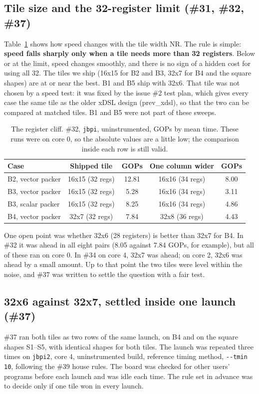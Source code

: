 \documentclass[11pt,a4paper]{article}
\newcommand{\slow}[1]{\textcolor{red!70!black}{#1}}
\begin{document}
\subsection{Tile size and the 32-register limit (\#31, \#32, \#37)}
\label{sec:tiles}
Table~\ref{tab:tiles} shows how speed changes with the tile width NR. The rule is simple: \textbf{speed falls
sharply only when a tile needs more than 32 registers}. Below or at the limit, speed changes smoothly, and there
is no sign of a hidden cost for using all 32. The tiles we ship (16x15 for B2 and B3, 32x7 for B4 and the square
shapes) are at or near the best. B1 and B5 ship with 32x6. That tile was not chosen by a speed test: it was
fixed by the issue \#2 test plan, which gives every case the same tile as the older xDSL design (prev\_xdsl),
so that the two can be compared at matched tiles. B1 and B5 were not part of these sweeps.

\begin{table}[h]
\centering\small
\begin{tabular}{@{}lcccc@{}}
\toprule
\textbf{Case} & \textbf{Shipped tile} & \textbf{GOPs} & \textbf{One column wider} & \textbf{GOPs} \\
\midrule
B2, vector packer & 16x15 (32 regs) & 12.81 & 16x16 (34 regs) & \slow{8.00} \\
B3, vector packer & 16x15 (32 regs) & 5.28 & 16x16 (34 regs) & \slow{3.11} \\
B3, scalar packer & 16x15 (32 regs) & 8.25 & 16x16 (34 regs) & \slow{4.86} \\
B4, vector packer & 32x7 (32 regs) & 7.84 & 32x8 (36 regs) & \slow{4.43} \\
\bottomrule
\end{tabular}
\caption{The register cliff. \#32, \texttt{jbpi}, uninstrumented, GOPs by mean time. These runs were on core 0,
so the absolute values are a little low; the comparison inside each row is still valid.}
\label{tab:tiles}
\end{table}

One open point was whether 32x6 (28 registers) is better than 32x7 for B4. In \#32 it was ahead in all eight
pairs (8.05 against 7.84 GOPs, for example), but all of these ran on core 0. In \#34 on core 4, 32x7 was ahead;
on core 2, 32x6 was ahead by a small amount. Up to that point the two tiles were level within the noise, and
\#37 was written to settle the question with a fair test.

\subsection{32x6 against 32x7, settled inside one launch (\#37)}
\label{sec:tile37}
\#37 ran both tiles as two rows of the same launch, on B4 and on the square shapes S1--S5, with identical shapes
for both tiles. The launch was repeated three times on \texttt{jbpi2}, core 4, uninstrumented build, reference
timing method, \texttt{-{}-tmin 10}, following the \#39 house rules. The board was checked for other users'
programs before each launch and was idle each time. The rule set in advance was to decide only if one tile won
in every launch.
\end{document}
